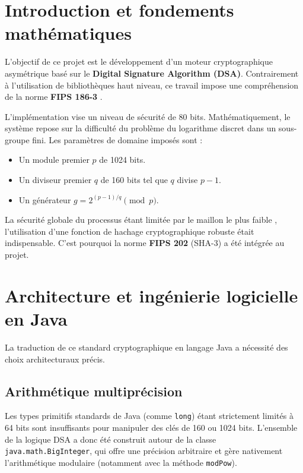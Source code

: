 \documentclass[12pt,a4paper]{article}
\begin{document}
\newpage
\tableofcontents
\newpage


\section{Introduction et fondements mathématiques}
L'objectif de ce projet est le développement d'un moteur cryptographique asymétrique basé sur le \textbf{Digital Signature Algorithm (DSA)}. Contrairement à l'utilisation de bibliothèques haut niveau, ce travail impose une compréhension de la norme \textbf{FIPS 186-3} \cite{fips186}. 

L'implémentation vise un niveau de sécurité de 80 bits. Mathématiquement, le système repose sur la difficulté du problème du logarithme discret dans un sous-groupe fini. Les paramètres de domaine imposés sont :
\begin{itemize}
    \item Un module premier $p$ de 1024 bits.
    \item Un diviseur premier $q$ de 160 bits tel que $q$ divise $p-1$.
    \item Un générateur $g = 2^{(p-1)/q} \pmod p$.
\end{itemize}

La sécurité globale du processus étant limitée par le maillon le plus faible \cite{fips186}, l'utilisation d'une fonction de hachage cryptographique robuste était indispensable. C'est pourquoi la norme \textbf{FIPS 202} (SHA-3) a été intégrée au projet.


\section{Architecture et ingénierie logicielle en Java}
La traduction de ce standard cryptographique en langage Java a nécessité des choix architecturaux précis.

\subsection{Arithmétique multiprécision}
Les types primitifs standards de Java (comme \texttt{long}) étant strictement limités à 64 bits sont insuffisants pour manipuler des clés de 160 ou 1024 bits. L'ensemble de la logique DSA a donc été construit autour de la classe \texttt{java.math.BigInteger}, qui offre une précision arbitraire et gère nativement l'arithmétique modulaire (notamment avec la méthode \texttt{modPow}).
\end{document}
